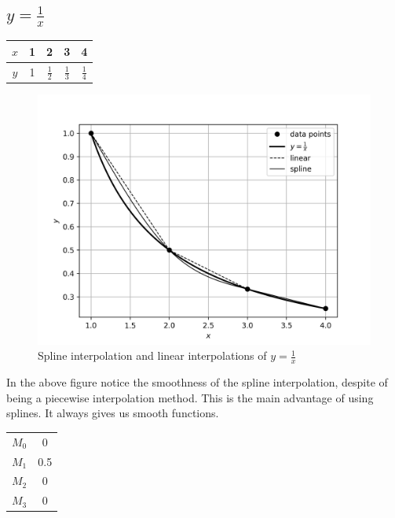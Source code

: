 \documentclass[12,a4paper]{article}
\begin{document}
   \subsection{$y = \frac{1}{x}$}
   \begin{table}[H]
       \centering
       \begin{tabular}{|c|c|c|c|c|}
       \hline
        $x$ & 1 & 2 & 3 & 4\\
        \hline
        $y$ & 1 & $\frac{1}{2}$ & $\frac{1}{3}$ & $\frac{1}{4}$\\
        \hline
       \end{tabular}
   \end{table}
   \begin{figure}[H]
       \centering
       \includegraphics[width=\textwidth]{plots/sq1a.png}
       \caption{Spline interpolation and linear interpolations of $y = \frac{1}{x}$}
       \label{fig:sq1a}
   \end{figure}
   In the above figure notice the smoothness of the spline interpolation, despite of being a piecewise interpolation method. This is the main advantage of using splines. It always gives us smooth functions.
   
   \begin{table}[H]
       \centering
       \begin{tabular}{|c|c|}
       \hline
        $M_0$ & 0 \\
        $M_1$ & 0.5\\
        $M_2$ & 0\\
        $M_3$ & 0\\
        \hline
       \end{tabular}
   \end{table}
   
\end{document}
